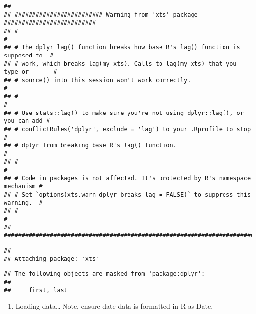 \documentclass[
]{article}
\providecommand{\tightlist}{%
  \setlength{\itemsep}{0pt}\setlength{\parskip}{0pt}}
\begin{document}
\begin{verbatim}
## 
## ######################### Warning from 'xts' package ##########################
## #                                                                             #
## # The dplyr lag() function breaks how base R's lag() function is supposed to  #
## # work, which breaks lag(my_xts). Calls to lag(my_xts) that you type or       #
## # source() into this session won't work correctly.                            #
## #                                                                             #
## # Use stats::lag() to make sure you're not using dplyr::lag(), or you can add #
## # conflictRules('dplyr', exclude = 'lag') to your .Rprofile to stop           #
## # dplyr from breaking base R's lag() function.                                #
## #                                                                             #
## # Code in packages is not affected. It's protected by R's namespace mechanism #
## # Set `options(xts.warn_dplyr_breaks_lag = FALSE)` to suppress this warning.  #
## #                                                                             #
## ###############################################################################
\end{verbatim}

\begin{verbatim}
## 
## Attaching package: 'xts'
\end{verbatim}

\begin{verbatim}
## The following objects are masked from 'package:dplyr':
## 
##     first, last
\end{verbatim}

\begin{enumerate}
\def\labelenumi{\alph{enumi})}
\setcounter{enumi}{1}
\tightlist
\item
  Loading data\ldots{} Note, ensure date data is formatted in R as Date.
\end{enumerate}
\end{document}
